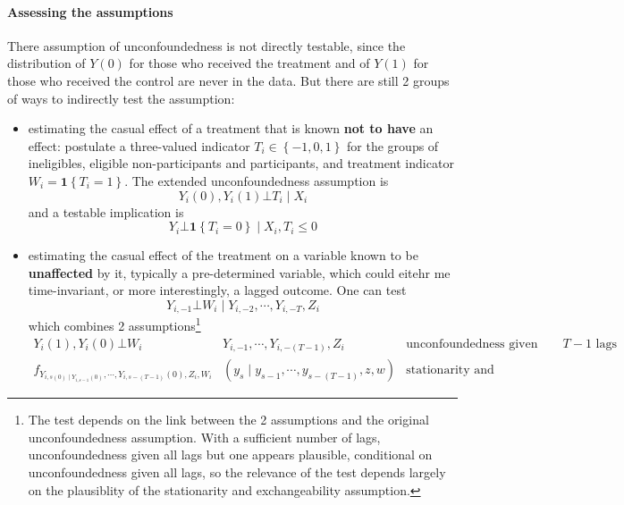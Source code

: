 \documentclass[twoside]{article}
\begin{document}
\paragraph*{Assessing the assumptions}
There assumption of unconfoundedness is not directly testable, since the distribution of $Y(0)$ for those who received the treatment and of $Y(1)$ for those who received the control are never in the data. But there are still 2 groups of ways to indirectly test the assumption:
\begin{itemize}
    \item estimating the casual effect of a treatment that is known \textbf{not to have} an effect: postulate a three-valued indicator $T_i\in\left\{-1,0,1\right\}$ for the groups of ineligibles, eligible non-participants and participants, and treatment indicator $W_i=\mathbf{1}\left\{T_i=1\right\}$. The extended unconfoundedness assumption is 
    $$ Y_i(0),Y_i(1) \bot T_i\mid X_i $$
    and a testable implication is 
    $$Y_i \bot \mathbf{1}\left\{T_i=0 \right\} \mid X_i,T_i\leq 0 $$
    \item estimating the casual effect of the treatment on a variable known to be \textbf{unaffected} by it, typically a pre-determined variable, which could eitehr me time-invariant, or more interestingly, a lagged outcome. One can test 
    $$ Y_{i,-1}\bot W_i\mid Y_{i,-2},\cdots,Y_{i,-T},Z_i $$
    which combines 2 assumptions\footnote{The test depends on the link between the 2 assumptions and the original unconfoundedness assumption. With a sufficient number of lags, unconfoundedness given all lags but one appears plausible, conditional on unconfoundedness given all lags, so the relevance of the test depends largely on the plausiblity of the stationarity and exchangeability assumption.}
    \begin{align*}
        Y_i(1),Y_i(0)\bot W_i &Y_{i,-1},\cdots,Y_{i,-(T-1)},Z_i &\text{unconfoundedness given only $T-1$ lags}\\
        f_{Y_{i,s(0)\mid Y_{i,s-1}(0)},\cdots,Y_{i,s-(T-1)}(0),Z_i,W_i}&\left(y_s\mid y_{s-1},\cdots, y_{s-(T-1)},z,w\right) &\text{stationarity and exchangeability}
    \end{align*}
\end{itemize}
\end{document}
